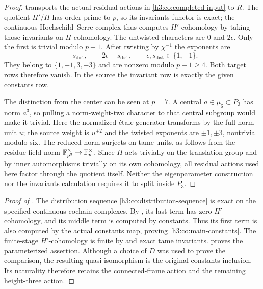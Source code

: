 \begin{proof}
 transports the actual residual actions in
\eqref{h3:co:completed-input} to $R$.  The quotient $H'/H$ has order
prime to $p$, so its invariants functor is exact; the continuous
Hochschild--Serre complex thus computes $H'$-cohomology by taking those
invariants on $H$-cohomology.  The untwisted characters are $0$ and
$2\epsilon$.  Only the first is trivial modulo $p-1$.
After twisting by $\chi^{-1}$ the exponents are
\[
 -s_{\mathrm{dist}},\qquad 2\epsilon-s_{\mathrm{dist}},\qquad
 \epsilon,s_{\mathrm{dist}}\in\{1,-1\}.
\]
They belong to $\{1,-1,3,-3\}$ and are nonzero modulo $p-1\geq4$.
Both target rows therefore vanish.  In the source the invariant row is
exactly the given constants row.

The distinction from the center can be seen at $p=7$.  A central
$a\in\mu_6\subset P_3$ has norm $a^3$, so pulling a norm-weight-two
character to that central subgroup would make it trivial.  Here the
normalized \'etale generator transforms by the full norm unit $u$;
the source weight is $u^{\pm2}$ and the twisted exponents are
$\pm1,\pm3$, nontrivial modulo six.  The reduced norm surjects on tame
units, as follows from the residue-field norm
$\mathbb F_{p^3}^\times\to\mathbb F_p^\times$.  Since $H$ acts trivially on the
translation group and by inner automorphisms trivially on its own
cohomology, all residual actions used here factor through the quotient
itself.  Neither the eigenparameter construction nor the invariants
calculation requires it to split inside $P_3$.
\end{proof}

\begin{proof}[Proof of ]
The distribution sequence \eqref{h3:co:distribution-sequence} is exact on
the specified continuous cochain complexes.  By
, its last term has zero $H'$-cohomology,
and its middle term is computed by constants.  Thus its first term is
also computed by the actual constants map, proving
\eqref{h3:co:main-constants}.  The finite-stage $H'$-cohomology is finite
by  and exact tame invariants.
 proves the parameterized assertion.  Although a
choice of $D$ was used to prove the comparison, the resulting
quasi-isomorphism is the original constants inclusion.  Its naturality
therefore retains the connected-frame action and the remaining
height-three action.
\end{proof}

